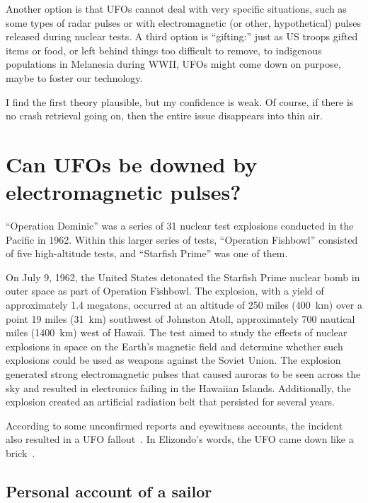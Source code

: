 Another option is that UFOs cannot deal with very specific situations, such as some types of radar pulses or with electromagnetic (or other, hypothetical) pulses released during nuclear tests. A third option is ``gifting:'' just as US troops gifted items or food, or left behind things too difficult to remove, to indigenous populations in Melanesia during WWII, UFOs might come down on purpose, maybe to foster our technology.

I find the first theory plausible, but my confidence is weak. Of course, if there is no crash retrieval going on, then the entire issue disappears into thin air.

\section{Can UFOs be downed by electromagnetic pulses?}
\label{2023-UFO-part-Perception-crash-retreivals-htdau}

``Operation Dominic'' was a series of 31 nuclear test explosions conducted in the Pacific in 1962.
Within this larger series of tests, ``Operation Fishbowl'' consisted of five high-altitude tests, and ``Starfish Prime''
was one of them.

On July 9, 1962, the United States detonated the Starfish Prime nuclear bomb in outer space as part of Operation Fishbowl.
The explosion, with a yield of approximately 1.4 megatons, occurred at an altitude of 250 miles (400~km) over a point 19 miles (31~km)
southwest of Johnston Atoll, approximately 700 nautical miles (1400~km) west of Hawaii.
The test aimed to study the effects of nuclear explosions in space on the Earth's magnetic field and determine
whether such explosions could be used as weapons against the Soviet Union.
The explosion generated strong electromagnetic pulses
that caused auroras to be seen across the sky and resulted in electronics failing in the Hawaiian Islands.
Additionally, the explosion created an artificial radiation belt that persisted for several years.

According to some unconfirmed reports and eyewitness accounts, the incident also resulted in a UFO fallout~\cite[Chapter~BDM - EMP, pp.~64f]{Omega_Point2022Nov}.
In Elizondo's words, the UFO came down like a brick~\cite[time = 38 min 44 sec]{Iandoli-Elizondo-Starfish-prime}.

\subsection{Personal account of a sailor}

